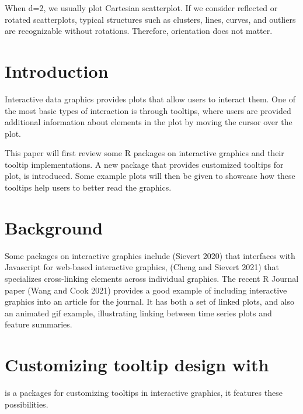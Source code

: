 When d=2, we usually plot Cartesian scatterplot. If we consider reflected or rotated scatterplots, typical structures such as clusters, lines, curves, and outliers are recognizable without rotations. Therefore, orientation does not matter.

\hypertarget{introduction-1}{%
\section{Introduction}\label{introduction-1}}

Interactive data graphics provides plots that allow users to interact them. One of the most basic types of interaction is through tooltips, where users are provided additional information about elements in the plot by moving the cursor over the plot.

This paper will first review some R packages on interactive graphics and their tooltip implementations. A new package  that provides customized tooltips for plot, is introduced. Some example plots will then be given to showcase how these tooltips help users to better read the graphics.

\hypertarget{background-1}{%
\section{Background}\label{background-1}}

Some packages on interactive graphics include  (Sievert 2020) that interfaces with Javascript for web-based interactive graphics,  (Cheng and Sievert 2021) that specializes cross-linking elements across individual graphics. The recent R Journal paper  (Wang and Cook 2021) provides a good example of including interactive graphics into an article for the journal. It has both a set of linked plots, and also an animated gif example, illustrating linking between time series plots and feature summaries.

\hypertarget{customizing-tooltip-design-with}{%
\section{\texorpdfstring{Customizing tooltip design with }{Customizing tooltip design with }}\label{customizing-tooltip-design-with}}

 is a packages for customizing tooltips in interactive graphics, it features these possibilities.

